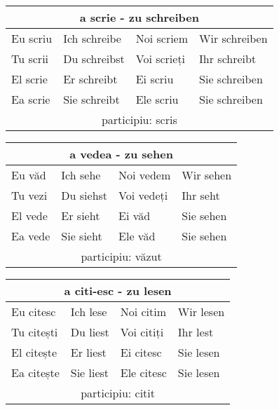 \documentclass[11pt, oneside]{article}
\begin{document}
%
\begin{center}
  \begin{tabular}{ |p{3.25cm}|p{3.25cm}||p{3.25cm}|p{3.25cm}| }
      \hline
      \multicolumn{4}{|c|}{a scrie - zu schreiben} \\
      \hline
      \hline
      Eu scriu & Ich schreibe & Noi scriem & Wir schreiben\\
      \hline
      Tu scrii & Du schreibst & Voi scrieți & Ihr schreibt\\
      \hline
      El scrie & Er schreibt & Ei scriu & Sie schreiben\\ 
      Ea scrie & Sie schreibt & Ele scriu & Sie schreiben\\
      \hline
      \multicolumn{4}{|c|}{participiu: scris} \\
      \hline
     \end{tabular}
\end{center}
%
\begin{center}
  \begin{tabular}{ |p{3.25cm}|p{3.25cm}||p{3.25cm}|p{3.25cm}| }
      \hline
      \multicolumn{4}{|c|}{a vedea - zu sehen} \\
      \hline
      \hline
      Eu văd & Ich sehe & Noi vedem & Wir sehen\\
      \hline
      Tu vezi & Du siehst & Voi vedeți & Ihr seht\\
      \hline
      El vede & Er sieht & Ei văd & Sie sehen\\ 
      Ea vede & Sie sieht & Ele văd & Sie sehen\\
      \hline
      \multicolumn{4}{|c|}{participiu: văzut} \\
      \hline
     \end{tabular}
\end{center}
%
\begin{center}
  \begin{tabular}{ |p{3.25cm}|p{3.25cm}||p{3.25cm}|p{3.25cm}| }
      \hline
      \multicolumn{4}{|c|}{a citi-esc - zu lesen} \\
      \hline
      \hline
      Eu citesc & Ich lese & Noi citim & Wir lesen\\
      \hline
      Tu citești & Du liest & Voi citiți & Ihr lest\\
      \hline
      El citește & Er liest & Ei citesc & Sie lesen\\ 
      Ea citește & Sie liest & Ele citesc & Sie lesen\\
      \hline
      \multicolumn{4}{|c|}{participiu: citit} \\
      \hline
     \end{tabular}
\end{center}
\end{document}
